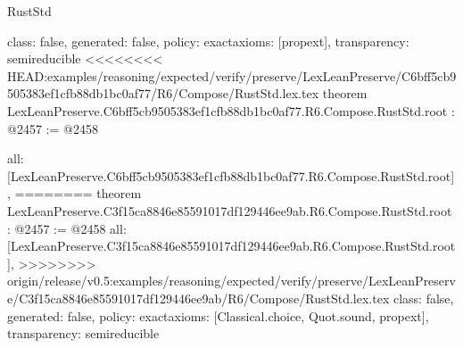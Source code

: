 \begin{lexlean}{RustStd}
\begin{coremodule}
{\begin{coremodule}
{{{{  class: false,
  generated: false,
  policy: exact{axioms: [propext]},
  transparency: semireducible
}
<<<<<<<< HEAD:examples/reasoning/expected/verify/preserve/LexLeanPreserve/C6bff5cb9505383ef1cfb88db1bc0af77/R6/Compose/RustStd.lex.tex
theorem LexLeanPreserve.C6bff5cb9505383ef1cfb88db1bc0af77.R6.Compose.RustStd.root : @2457 := @2458 {
  all: [LexLeanPreserve.C6bff5cb9505383ef1cfb88db1bc0af77.R6.Compose.RustStd.root],
========
theorem LexLeanPreserve.C3f15ca8846e85591017df129446ee9ab.R6.Compose.RustStd.root : @2457 := @2458 {
  all: [LexLeanPreserve.C3f15ca8846e85591017df129446ee9ab.R6.Compose.RustStd.root],
>>>>>>>> origin/release/v0.5:examples/reasoning/expected/verify/preserve/LexLeanPreserve/C3f15ca8846e85591017df129446ee9ab/R6/Compose/RustStd.lex.tex
  class: false,
  generated: false,
  policy: exact{axioms: [Classical.choice, Quot.sound, propext]},
  transparency: semireducible
}

}}}}
\end{coremodule}}
\end{coremodule}
\end{lexlean}
